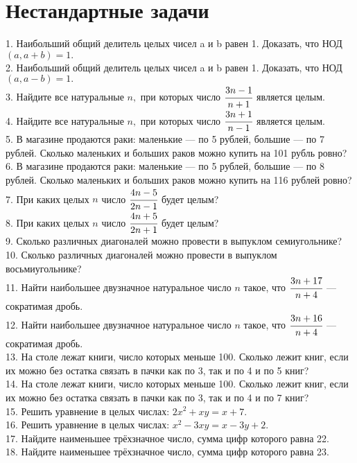 \section{Нестандартные задачи}
1. Наибольший общий делитель целых чисел a и b равен 1. Доказать, что
НОД$(a, a+b)=1.$\\
2. Наибольший общий делитель целых чисел a и b равен 1. Доказать, что
НОД$(a, a-b)=1.$\\
3. Найдите все натуральные $n,$ при которых число $\cfrac{3n-1}{n+1}$ является целым.\\
4. Найдите все натуральные $n,$ при которых число $\cfrac{3n+1}{n-1}$ является целым.\\
5. В магазине продаются раки: маленькие --- по 5 рублей, большие --- по 7 рублей. Сколько маленьких и больших раков можно купить на 101 рубль ровно?\\
6. В магазине продаются раки: маленькие --- по 5 рублей, большие --- по 8 рублей. Сколько маленьких и больших раков можно купить на 116 рублей ровно?\\
7. При каких целых $n$ число $\cfrac{4n-5}{2n-1}$ будет целым?\\
8. При каких целых $n$ число $\cfrac{4n+5}{2n+1}$ будет целым?\\
9. Сколько различных диагоналей можно провести в выпуклом семиугольнике?\\
10. Сколько различных диагоналей можно провести в выпуклом восьмиугольнике?\\
11. Найти наибольшее двузначное натуральное число $n$ такое, что $\cfrac{3n+17}{n+4}$ --- сократимая дробь.\\
12. Найти наибольшее двузначное натуральное число $n$ такое, что $\cfrac{3n+16}{n+4}$ --- сократимая дробь.\\
13. На столе лежат книги, число которых меньше 100. Сколько лежит книг, если их можно без остатка связать в пачки как по 3, так и по 4 и по 5 книг?\\
14. На столе лежат книги, число которых меньше 100. Сколько лежит книг, если их можно без остатка связать в пачки как по 3, так и по 4 и по 7 книг?\\
15. Решить уравнение в целых числах: $2x^2+xy=x+7.$\\
16. Решить уравнение в целых числах: $x^2-3xy=x-3y+2.$\\
17. Найдите наименьшее трёхзначное число, сумма цифр которого равна 22.\\
18. Найдите наименьшее трёхзначное число, сумма цифр которого равна 23.\\

